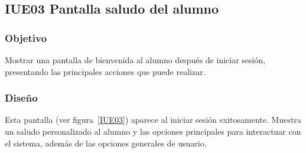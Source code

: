 \subsection{IUE03 Pantalla saludo del alumno}

\label{IUE03}
\newpage

\subsubsection{Objetivo}
Mostrar una pantalla de bienvenida al alumno después de iniciar sesión, presentando las principales acciones que puede realizar.

\subsubsection{Diseño}
Esta pantalla  (ver figura~\ref{IUE03}) aparece al iniciar sesión exitosamente. Muestra un saludo personalizado al alumno y las opciones principales para interactuar con el sistema, además de las opciones generales de usuario.

